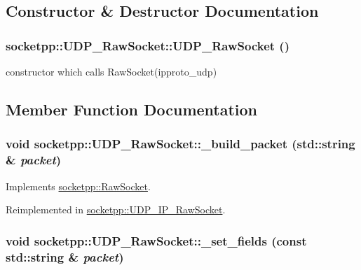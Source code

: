 \subsection{Constructor \& Destructor Documentation}
\hypertarget{classsocketpp_1_1UDP__RawSocket_508aba470eee4010ca16007823c91650}{
\subsubsection[{UDP\_\-RawSocket}]{\setlength{\rightskip}{0pt plus 5cm}socketpp::UDP\_\-RawSocket::UDP\_\-RawSocket ()}}
\label{classsocketpp_1_1UDP__RawSocket_508aba470eee4010ca16007823c91650}


constructor which calls RawSocket(ipproto\_\-udp) 



\subsection{Member Function Documentation}
\hypertarget{classsocketpp_1_1UDP__RawSocket_fe8cc7391c23dcf011f285b1605cad6b}{
\subsubsection[{\_\-build\_\-packet}]{\setlength{\rightskip}{0pt plus 5cm}void socketpp::UDP\_\-RawSocket::\_\-build\_\-packet (std::string \& {\em packet})}}
\label{classsocketpp_1_1UDP__RawSocket_fe8cc7391c23dcf011f285b1605cad6b}




Implements \hyperlink{classsocketpp_1_1RawSocket_eb0a3f716c0fc46efa4123acf0fe1e66}{socketpp::RawSocket}.

Reimplemented in \hyperlink{classsocketpp_1_1UDP__IP__RawSocket_16035f1b701b898f0e4de44a9ac8bbb3}{socketpp::UDP\_\-IP\_\-RawSocket}.\hypertarget{classsocketpp_1_1UDP__RawSocket_a2dd7ab190a6730f9272eced4e648b50}{
\subsubsection[{\_\-set\_\-fields}]{\setlength{\rightskip}{0pt plus 5cm}void socketpp::UDP\_\-RawSocket::\_\-set\_\-fields (const std::string \& {\em packet})}}
\label{classsocketpp_1_1UDP__RawSocket_a2dd7ab190a6730f9272eced4e648b50}




